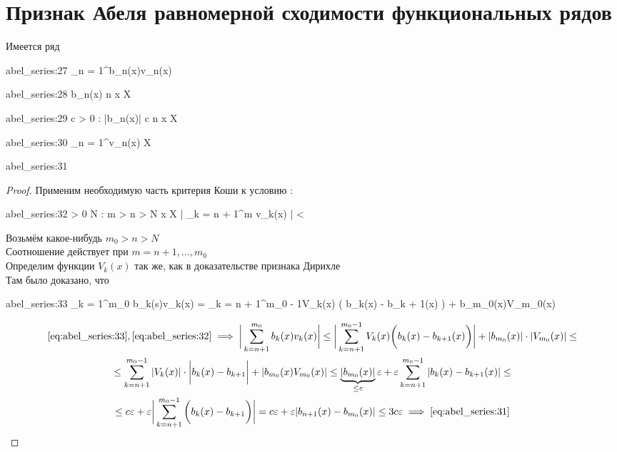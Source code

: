 \section{Признак Абеля равномерной сходимости функциональных рядов}

\begin{theorem}
	Имеется ряд
	\begin{equ}{abel_series:27}
		\sum_{n = 1}^\infty b_n(x)v_n(x)
	\end{equ}
	\begin{equ}{abel_series:28}
		b_n(x)  n \quad \forall x \in X
	\end{equ}
	\begin{equ}{abel_series:29}
		\exist c > 0 : \quad |b_n(x)| \le c \quad \forall n \quad \forall x \in X
	\end{equ}
	\begin{equ}{abel_series:30}
		\sum_{n = 1}^\infty v_n(x)  X
	\end{equ}
	\begin{equ}{abel_series:31}
		\implies {}
	\end{equ}
\end{theorem}

\begin{proof}
	Применим необходимую часть критерия Коши к условию :
	\begin{equ}{abel_series:32}
		\forall \veps > 0 \quad \exist N : \quad \forall m > n > N \quad \forall x \in X \quad \bigg| \sum_{k = n + 1}^m v_k(x) \bigg| < \veps
	\end{equ}
	Возьмём какое-нибудь $ m_0 > n > N $ \\
	Соотношение  действует при $ m = n + 1, ..., m_0 $ \\
	Определим функции $ V_k(x) $ так же, как в доказательстве признака Дирихле \\
	Там было доказано, что
	\begin{equ}{abel_series:33}
		\sum_{k = 1}^{m_0} b_k(s)v_k(x) = \sum_{k = n + 1}^{m_0 - 1}V_k(x) \bigg( b_k(x) - b_{k + 1}(x) \bigg) + b_{m_0}(x)V_{m_0}(x)
	\end{equ}
	\begin{multline*}
		\eref{abel_series:33}, \eref{abel_series:32} \implies \bigg| \sum_{k = n + 1}^{m_0} b_k(x)v_k(x) \bigg| \le \bigg| \sum_{k = n + 1}^{m_0 - 1} V_k(x) \bigg( b_k(x) - b_{k + 1}(x) \bigg) \bigg| + |b_{m_0}(x)| \cdot |V_{m_0}(x)| \le \\
		\le \sum_{k = n + 1}^{m_0 - 1} |V_k(x)| \cdot \bigg| b_k(x) - b_{k + 1} \bigg| + |b_{m_0}(x)V_{m_0}(x)| \le \underbrace{|b_{m_0}(x)|}_{\le c} \veps + \veps \sum_{k = n + 1}^{m_0 - 1} |b_k(x) - b_{k + 1}(x)| \le \\
		\le c\veps + \veps \bigg| \sum_{k = n + 1}^{m_0 - 1} \bigg( b_k(x) - b_{k + 1} \bigg) \bigg| = c\veps + \veps |b_{n + 1}(x) - b_{m_0}(x)| \le 3c\veps \implies \eref{abel_series:31}
	\end{multline*}
\end{proof}

